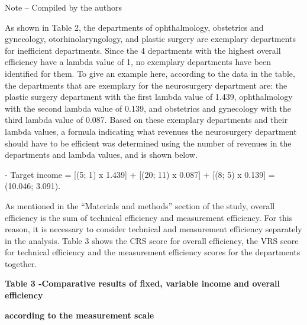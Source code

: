 Note -- Compiled by the authors

As shown in Table 2, the departments of ophthalmology, obstetrics and
gynecology, otorhinolaryngology, and plastic surgery are exemplary
departments for inefficient departments. Since the 4 departments with
the highest overall efficiency have a lambda value of 1, no exemplary
departments have been identified for them. To give an example here,
according to the data in the table, the departments that are exemplary
for the neurosurgery department are: the plastic surgery department with
the first lambda value of 1.439, ophthalmology with the second lambda
value of 0.139, and obstetrics and gynecology with the third lambda
value of 0.087. Based on these exemplary departments and their lambda
values, a formula indicating what revenues the neurosurgery department
should have to be efficient was determined using the number of revenues
in the departments and lambda values, and is shown below.

- Target income = {[}(5; 1) x 1.439{]} + {[}(20; 11) x 0.087{]} + {[}(8;
5) x 0.139{]} = (10.046; 3.091).

As mentioned in the ``Materials and methods'' section of the study,
overall efficiency is the sum of technical efficiency and measurement
efficiency. For this reason, it is necessary to consider technical and
measurement efficiency separately in the analysis. Table 3 shows the CRS
score for overall efficiency, the VRS score for technical efficiency and
the measurement efficiency scores for the departments together.

{\bfseries Table 3 -Comparative results of fixed, variable income and
overall efficiency}

{\bfseries according to the measurement scale}

